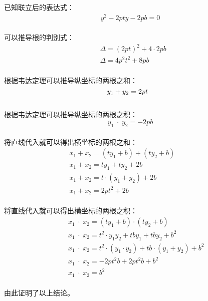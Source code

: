 \documentclass[UTF8]{ctexart}
\begin{document}
    已知联立后的表达式：
    \begin{align}
        y^2-2pty-2pb=0
    \end{align}\\
    可以推导根的判别式：
    \begin{align}
        &\Delta=(2pt)^2+4\cdot 2pb\\[3mm]
        &\Delta=4p^2t^2+8pb
    \end{align}\\
    根据韦达定理可以推导纵坐标的两根之和：
    \begin{equation}
        y_1+y_2=2pt\hphantom{-}
    \end{equation}\\
    根据韦达定理可以推导纵坐标的两根之积：
    \begin{equation}
        y_1\hspace{3pt}\cdot\hspace{3pt}y_2=-2pb
    \end{equation}\\
    将直线代入就可以得出横坐标的两根之和：\vspace{3pt}
    \begin{align}
        &x_1+x_2=(ty_1+b)+(ty_2+b)~~~~~~~~~~~~~~\\[3mm]
        &x_1+x_2=ty_1+ty_2+2b\\[3mm]
        &x_1+x_2=t\cdot(y_1+y_2)+2b\\[3mm]
        &x_1+x_2=2pt^2+2b
    \end{align}\\
    将直线代入就可以得出横坐标的两根之积：\vspace{3pt}
    \begin{align}
        &~~~~x_1\hspace{3pt}\cdot\hspace{3pt}x_2=(ty_1+b)\cdot(ty_2+b)\\[3mm]
        &~~~~x_1\hspace{3pt}\cdot\hspace{3pt}x_2=t^2\cdot y_1y_2+tby_1+tby_2+b^2\\[3mm]
        &~~~~x_1\hspace{3pt}\cdot\hspace{3pt}x_2=t^2\cdot(y_1\cdot y_2)+tb\cdot(y_1+y_2)+b^2\\[3mm]
        &~~~~x_1\hspace{3pt}\cdot\hspace{3pt}x_2=-2pt^2b+2pt^2b+b^2\\[3mm]
        &~~~~x_1\hspace{3pt}\cdot\hspace{3pt}x_2=b^2
    \end{align}\\
    由此证明了以上结论。
\end{document}
